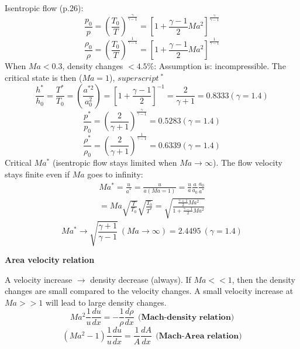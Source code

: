 \documentclass[8pt, landscape, fleqn]{scrartcl}
\begin{document}
\begin{multicols*}{3}
Isentropic flow (p.26):
\begin{equation*}
    \frac{p_0}{p} = \left( \frac{T_0}{T}\right)^{\frac{\gamma}{\gamma -1}} = \left[ 1 + \frac{\gamma-1}{2} Ma^2 \right]^{\frac{\gamma}{\gamma-1}}
\end{equation*}
\begin{equation*}
    \frac{\rho_0}{\rho} = \left( \frac{T_0}{T} \right)^{\frac{1}{\gamma-1}} = \left[ 1 + \frac{\gamma-1}{2} Ma^2 \right]^{\frac{1}{\gamma-1}}
\end{equation*}
When $Ma < 0.3$, density changes $< 4.5 \%$: Assumption is: incompressible. The critical state is then ($Ma = 1$), $superscript~^*$
\begin{equation*}
    \frac{h^*}{h_0} = \frac{T^*}{T_0} = \left( \frac{a^{*2}}{a_0^2}\right) = \left[ 1 + \frac{\gamma -1 }{2}\right]^{-1} = \frac{2}{\gamma+1} = 0.8333 (\gamma = 1.4)
\end{equation*}
\begin{equation*}
    \frac{p^*}{p_0} = \left( \frac{2}{\gamma+1} \right)^{\frac{\gamma}{\gamma-1}} = 0.5283 (\gamma = 1.4)
\end{equation*}
\begin{equation*}
    \frac{\rho^*}{\rho_0} = \left( \frac{2}{\gamma+1} \right)^{\frac{1}{\gamma-1}} = 0.6339 (\gamma = 1.4)
\end{equation*}
Critical $Ma^*$ (isentropic flow stays limited when $Ma \rightarrow \infty$). The flow velocity stays finite even if $Ma$ goes to infinity:
\begin{align*}
    Ma^* = \frac{u}{a^*} = \frac{u}{a(Ma=1)} = \frac{u}{a}\frac{a}{a_0}\frac{a_0}{a^*} \\
    = Ma \sqrt{\frac{T}{T_0}}\sqrt{\frac{T_0}{T^*}} = \sqrt{\frac{\frac{\gamma+1}{2}Ma^2}{1+\frac{\gamma-1}{2}Ma^2}}
\end{align*}
\begin{equation*}
    Ma^* \rightarrow \sqrt{\frac{\gamma+1}{\gamma-1}}~(Ma \rightarrow \infty) = 2.4495~(\gamma = 1.4)
\end{equation*}

\textbf{Area velocity relation}

A velocity increase $\rightarrow$ density decrease (always). If $Ma << 1$, then the density changes are small compared to the velocity changes. A small velocity increase at $Ma >> 1$ will lead to large density changes.
\begin{equation*}
    Ma^2 \frac{1}{u} \frac{d u}{d x} = -\frac{1}{\rho} \frac{d \rho}{d x}~~\textbf{(Mach-density relation)}
\end{equation*}
\begin{equation*}
    \left( Ma^2 -1 \right) \frac{1}{u} \frac{d u}{d x} = \frac{1}{A} \frac{d A}{d x}~~\textbf{(Mach-Area relation)}
\end{equation*}


\end{multicols*}
\end{document}
